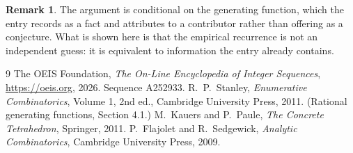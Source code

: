 \documentclass[11pt,a4paper]{article}
\theoremstyle{plain}
\theoremstyle{definition}
\newtheorem{remark}[theorem]{Remark}
\begin{document}
\begin{remark}
The argument is conditional on the generating function, which the entry records as a fact and
attributes to a contributor rather than offering as a conjecture. What is shown here is that
the empirical recurrence is not an independent guess: it is equivalent to information the
entry already contains.
\end{remark}

\begin{thebibliography}{9}
 The OEIS Foundation, \emph{The On-Line Encyclopedia of Integer
Sequences}, \url{https://oeis.org}, 2026. Sequence A252933.
 R.~P.~Stanley, \emph{Enumerative Combinatorics}, Volume 1, 2nd ed.,
Cambridge University Press, 2011. (Rational generating functions, Section 4.1.)
 M.~Kauers and P.~Paule, \emph{The Concrete Tetrahedron}, Springer, 2011.
 P.~Flajolet and R.~Sedgewick, \emph{Analytic Combinatorics}, Cambridge
University Press, 2009.
\end{thebibliography}
\end{document}
